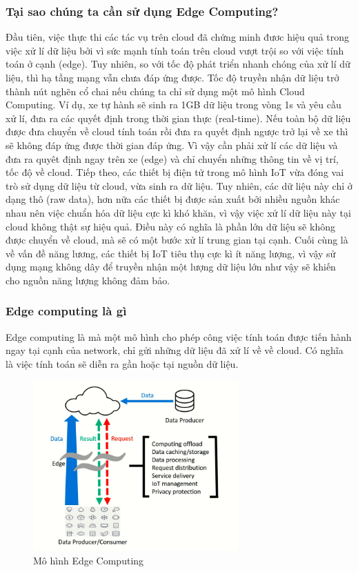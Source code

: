 \documentclass[a4paper]{report}
\begin{document}
\subsubsection{Tại sao chúng ta cần sử dụng Edge Computing?} 

Đầu tiên, việc thực thi các tác vụ trên cloud đã chứng minh đươc hiệu quả trong việc xử lí dữ liệu bởi vì sức mạnh tính toán trên cloud vượt trội so với việc tính toán ở cạnh (edge). Tuy nhiên, so với tốc độ phát triển nhanh chóng của xử lí dữ liệu, thì hạ tầng mạng vẫn chưa đáp ứng được. Tốc độ truyền nhận dữ liệu trở thành nút nghẽn cổ chai nếu chúng ta chỉ sử dụng một mô hình Cloud Computing. Ví dụ, xe tự hành sẽ sinh ra 1GB dữ liệu trong vòng 1s và yêu cầu xử lí, đưa ra các quyết định trong thời gian thực (real-time). Nếu toàn bộ dữ liệu được đưa chuyển về cloud tính toán rồi đưa ra quyết định ngược trở lại về xe thì sẽ không đáp ứng được thời gian đáp ứng. Vì vậy cần phải xử lí các dữ liệu và đưa ra quyêt định ngay trên xe (edge) và chỉ chuyển những thông tin về vị trí, tốc độ về cloud.
Tiếp theo, các thiết bị điện tử trong mô hình IoT vừa đóng vai trò sử dụng dữ liệu từ cloud, vừa sinh ra dữ liệu. Tuy nhiên, các dữ liệu này chỉ ở dạng thô (raw data), hơn nữa các thiết bị được sản xuất bởi nhiều nguồn khác nhau nên việc chuẩn hóa dữ liệu cực kì khó khăn, vì vậy việc xử lí dữ liệu này tại cloud không thật sự hiệu quả. Điều này có nghĩa là phần lớn dữ liệu sẽ không được chuyển về cloud, mà sẽ có một bước xử lí trung gian tại cạnh. Cuối cùng là về vấn đề năng lương, các thiết bị IoT tiêu thụ cực kì ít năng lượng, vì vậy sử dụng mạng không dây để truyền nhận một lượng dữ liệu lớn như vậy sẽ khiến cho nguồn năng lượng không đảm bảo.

\subsubsection{Edge computing là gì}
Edge computing là mà một mô hình cho phép công việc tính toán được tiến hành ngay tại cạnh của network, chỉ gửi những dữ liệu đã xử lí về về cloud. Có nghĩa là việc tính toán sẽ diễn ra gần hoặc tại nguồn dữ liệu.

\begin{figure}[h]
\centering
\includegraphics[width=0.7\textwidth]{edge.png}
\caption{\label{fig:2.444}  Mô hình Edge Computing}
\end{figure}
	
\end{document}
